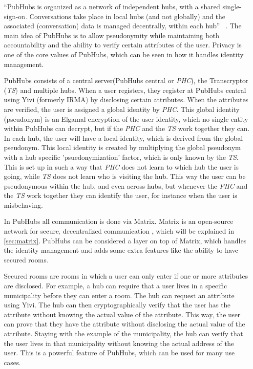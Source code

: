 \documentclass{report}
\begin{document}
“PubHubs is organized as a network of independent hubs, with a shared single-sign-on. Conversations take place in
local hubs (and not globally) and the associated (conversation) data is managed decentrally, within each hub”~
\cite{jacobs_pubhubs_2023}. The main idea of PubHubs is to allow pseudonymity while maintaining both accountability
and the ability to verify certain attributes of the user. Privacy is one of the core values of PubHubs, which can be
seen in how it handles identity management.

PubHubs consists of a central server(PubHubs central or \textit{PHC}), the Transcryptor (\textit{TS}) and multiple
hubs.
When a user registers, they register at PubHubs central using Yivi (formerly IRMA)\cite{alpar_irma_nodate} by disclosing
certain attributes. When the attributes are verified, the user is assigned a global identity by \textit{PHC}.
This global identity (pseudonym) is an Elgamal encryption of the user identity, which no single entity within PubHubs
can decrypt, but if the \textit{PHC} and the \textit{TS} work together they can. In each hub, the user will have a
local identity, which is derived from the global pseudonym. This local identity is created by multiplying the
global pseudonym with a hub specific 'psuedonymization' factor, which is only known by the \textit{TS}. This is set
up in such a way that \textit{PHC} does not learn to which hub the user is going, while \textit{TS} does not learn
who is visiting the hub. This way the user can be pseudonymous within the hub, and even across hubs, but whenever the
\textit{PHC} and the \textit{TS} work together they can identify the user, for instance when the user is misbehaving.

In PubHubs all communication is done via Matrix. Matrix is an open-source network for secure, decentralized
communication \cite{noauthor_matrixorg_nodate}, which will be explained in \autoref{sec:matrix}. PubHubs can be considered a
layer on top of Matrix, which handles the identity management and adds some extra features like the ability to have
secured rooms.

Secured rooms are rooms in which a user can only enter if one or more attributes are disclosed. For example, a hub can
require that a user lives in a specific municipality before they can enter a room. The hub can request an attribute
using Yivi. The hub can then cryptographically verify that the user has the attribute without knowing the actual
value of the attribute. This way, the user can prove that they have the attribute without disclosing the actual
value of the attribute. Staying with the example of the municipality, the hub can verify that the user lives in that
municipality without knowing the actual address of the user. This is a powerful feature of PubHubs, which can be used
for many use cases.
\end{document}
